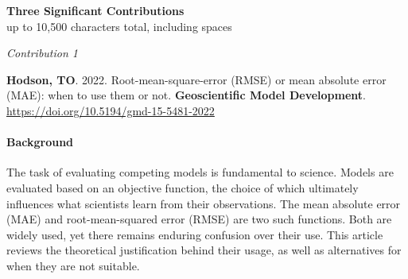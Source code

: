 \documentclass[12pt]{article}
\begin{document}
\begin{comment}

LaTeX code for contributions subheadings:

\raggedright Background--
\vspace{10pt}

*** YOUR BACKGROUND TEXT HERE ***

\vspace{10pt}
\raggedright Role--
\vspace{10pt}

*** YOUR ROLE TEXT HERE ***

\vspace{10pt}
\raggedright Results--
\vspace{10pt}

*** YOUR RESULTS TEXT HERE ***

\vspace{10pt}
\raggedright Impact--
\vspace{10pt}

*** YOUR IMPACT TEXT HERE ***

\end{comment}

\vspace{10pt}
\centering \textbf{Three Significant Contributions} \\
\centering up to 10,500 characters total, including spaces \\


\vspace{10pt}
\raggedright \textit{Contribution 1} \\
\vspace{10pt}


\textbf{Hodson, TO}. 2022.
Root-mean-square-error (RMSE) or mean absolute error (MAE):
when to use them or not.
\textbf{Geoscientific Model Development}. \url{https://doi.org/10.5194/gmd-15-5481-2022}

\paragraph{Background}
The task of evaluating competing models is fundamental to science.
Models are evaluated based on an objective function,
the choice of which ultimately influences what scientists learn from their observations.
The mean absolute error (MAE) and root-mean-squared error (RMSE) are two such functions.
Both are widely used, yet there remains enduring confusion over their use. 
This article reviews the theoretical justification behind their usage,
as well as alternatives for when they are not suitable.
\end{document}
